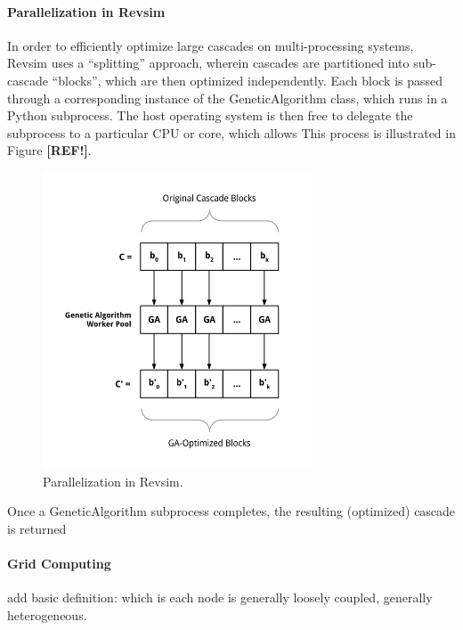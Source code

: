 \paragraph{Parallelization in Revsim} 
In order to efficiently optimize large cascades on multi-processing systems, Revsim uses a ``splitting'' approach, wherein cascades are partitioned into sub-cascade ``blocks'', which are then optimized independently. Each block is passed through a corresponding instance of the GeneticAlgorithm class, which runs in a Python subprocess. The host operating system is then free to delegate the subprocess to a particular CPU or core, which allows This process is illustrated in Figure {\bf [REF!]}.
\begin{figure}
  \begin{center}
    \includegraphics[width=80mm]{diagrams/parallelization.png}
  \end{center}
  \caption{Parallelization in Revsim.}
\end{figure}

Once a GeneticAlgorithm subprocess completes, the resulting (optimized) cascade is returned 


\paragraph{Grid Computing}
add basic definition: which is each node is generally loosely coupled, generally heterogeneous.